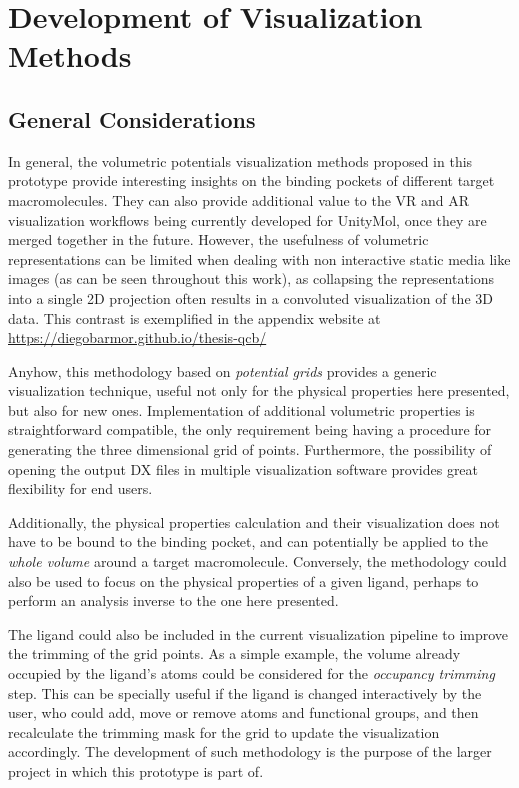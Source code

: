 \section{Development of Visualization Methods}
  \subsection{General Considerations}
    In general, the volumetric potentials visualization methods proposed in this prototype provide interesting insights on the binding pockets of different target macromolecules. They can also provide additional value to the VR and AR visualization workflows being currently developed for UnityMol, once they are merged together in the future. However, the usefulness of volumetric representations can be limited when dealing with non interactive static media like images (as can be seen throughout this work), as collapsing the representations into a single 2D projection often results in a convoluted visualization of the 3D data. This contrast is exemplified in the appendix website at \url{https://diegobarmor.github.io/thesis-qcb/}

    Anyhow, this methodology based on \textit{potential grids} provides a generic visualization technique, useful not only for the physical properties here presented, but also for new ones. Implementation of additional volumetric properties is straightforward compatible, the only requirement being having a procedure for generating the three dimensional grid of points. Furthermore, the possibility of opening the output DX files in multiple visualization software provides great flexibility for end users.

    Additionally, the physical properties calculation and their visualization does not have to be bound to the binding pocket, and can potentially be applied to the \textit{whole volume} around a target macromolecule. Conversely, the methodology could also be used to focus on the physical properties of a given ligand, perhaps to perform an analysis inverse to the one here presented.

    The ligand could also be included in the current visualization pipeline to improve the trimming of the grid points. As a simple example, the volume already occupied by the ligand's atoms could be considered for the \textit{occupancy trimming} step. This can be specially useful if the ligand is changed interactively by the user, who could add, move or remove atoms and functional groups, and then recalculate the trimming mask for the grid to update the visualization accordingly. The development of such methodology is the purpose of the larger project in which this prototype is part of.

